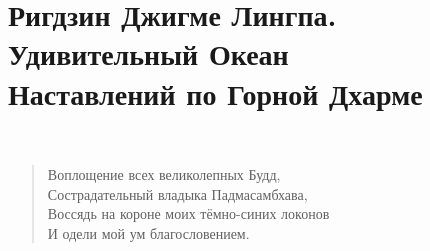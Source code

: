 
\newpage
\section{Ригдзин Джигме Лингпа.\\
Удивительный Океан\\
Наставлений по Горной Дхарме}
\\
\begin{verse}
Воплощение всех великолепных Будд,\\
Сострадательный владыка Падмасамбхава,\\
Воссядь на короне моих тёмно-синих локонов\\
И одели мой ум благословением.
\end{verse}

